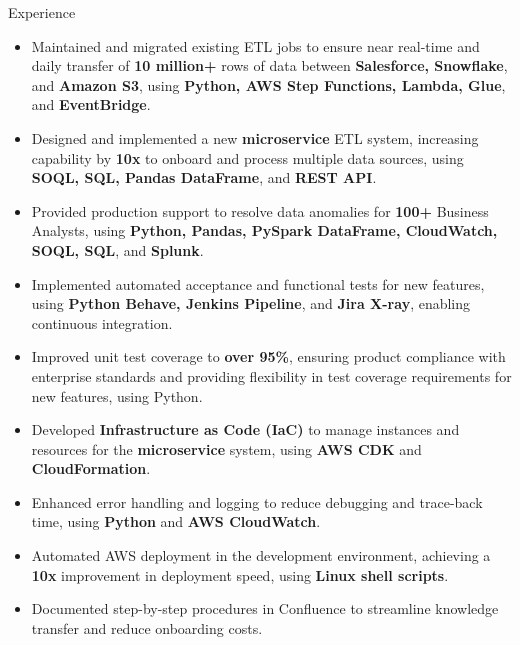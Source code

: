 \documentclass{resume} %
\begin{document}
\begin{workSection}{Experience}
      \experienceItem[
      company=Capital One,
      location=Plano{,} TX,
      position=Senior Software Engineer,
      duration=Feb. 2024 – Present
      ]
      \vspace{-0.65em}
      \begin{itemize}
            \itemsep -6pt {}
            \item Maintained and migrated existing ETL jobs to ensure near real-time and daily transfer of \textbf{10 million+} rows of data between \textbf{Salesforce, Snowflake}, and \textbf{Amazon S3}, using \textbf{Python, AWS Step Functions, Lambda, Glue}, and \textbf{EventBridge}.
            \item Designed and implemented a new \textbf{microservice} ETL system, increasing capability by \textbf{10x} to onboard and process multiple data sources, using \textbf{SOQL, SQL, Pandas DataFrame}, and \textbf{REST API}.
            \item Provided production support to resolve data anomalies for \textbf{100+} Business Analysts, using \textbf{Python, Pandas, PySpark DataFrame, CloudWatch, SOQL, SQL}, and \textbf{Splunk}.
            \item Implemented automated acceptance and functional tests for new features, using \textbf{Python Behave, Jenkins Pipeline}, and \textbf{Jira X-ray}, enabling continuous integration.
            \item Improved unit test coverage to \textbf{over 95\%}, ensuring product compliance with enterprise standards and providing flexibility in test coverage requirements for new features, using Python.
            \item Developed \textbf{Infrastructure as Code (IaC)} to manage instances and resources for the \textbf{microservice} system, using \textbf{AWS CDK} and \textbf{CloudFormation}.
            \item Enhanced error handling and logging to reduce debugging and trace-back time, using \textbf{Python} and \textbf{AWS CloudWatch}.
            \item Automated AWS deployment in the development environment, achieving a \textbf{10x} improvement in deployment speed, using \textbf{Linux shell scripts}.
            \item Documented step-by-step procedures in Confluence to streamline knowledge transfer and reduce onboarding costs.
      \end{itemize}


\end{workSection}
\end{document}
